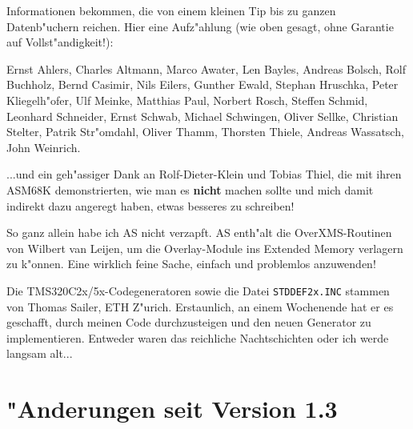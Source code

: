 \documentclass[12pt,a4paper,twoside]{report}
\newcommand{\bb}[1]{{\bf #1}}
\newcommand{\tty}[1]{{\tt #1}}
\begin{document}
{Informationen bekommen, die von einem kleinen Tip bis zu ganzen
Datenb"uchern reichen.  Hier eine Aufz"ahlung (wie oben gesagt, ohne 
Garantie auf Vollst"andigkeit!):
\par 
Ernst Ahlers, Charles Altmann, Marco Awater, Len Bayles, Andreas Bolsch,
Rolf Buchholz, Bernd Casimir, Nils Eilers, Gunther Ewald, Stephan Hruschka, Peter
Kliegelh"ofer, Ulf Meinke, Matthias Paul, Norbert Rosch, Steffen Schmid,
Leonhard Schneider, Ernst Schwab, Michael Schwingen, Oliver Sellke,
Christian Stelter, Patrik Str"omdahl, Oliver Thamm, Thorsten Thiele,
Andreas Wassatsch, John Weinrich.
\par
...und ein geh"assiger Dank an Rolf-Dieter-Klein und Tobias Thiel, die
mit ihren ASM68K demonstrierten, wie man es \bb{nicht} machen sollte und
mich damit indirekt dazu angeregt haben, etwas besseres zu schreiben!
\par
So ganz allein habe ich AS nicht verzapft.  AS enth"alt die
OverXMS-Routinen von Wilbert van Leijen, um die Overlay-Module ins
Extended Memory verlagern zu k"onnen.  Eine wirklich feine Sache,
einfach und problemlos anzuwenden!
\par
Die TMS320C2x/5x-Codegeneratoren sowie die Datei \tty{STDDEF2x.INC}
stammen von Thomas Sailer, ETH Z"urich.  Erstaunlich, an einem Wochenende
hat er es geschafft, durch meinen Code durchzusteigen und den neuen
Generator zu implementieren.  Entweder waren das reichliche Nachtschichten
oder ich werde langsam alt...


\cleardoublepage
\chapter{"Anderungen seit Version 1.3}

}
\end{document}
